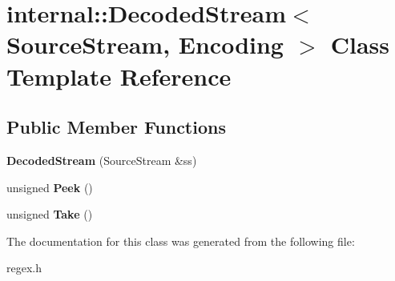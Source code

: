 \hypertarget{a02264}{}\section{internal\+:\+:Decoded\+Stream$<$ Source\+Stream, Encoding $>$ Class Template Reference}
\label{a02264}
\subsection*{Public Member Functions}
\begin{DoxyCompactItemize}
\item 
\mbox{\label{a02264_a45cf40c4e515be8aaa8cd020eaa67595}} 
{\bfseries Decoded\+Stream} (Source\+Stream \&ss)
\item 
\mbox{\label{a02264_ac78f2cbc03ae0d79a0fcfe6d56589d70}} 
unsigned {\bfseries Peek} ()
\item 
\mbox{\label{a02264_a62b45969ce169bef1da0600490329857}} 
unsigned {\bfseries Take} ()
\end{DoxyCompactItemize}


The documentation for this class was generated from the following file\+:\begin{DoxyCompactItemize}
\item 
regex.\+h\end{DoxyCompactItemize}
